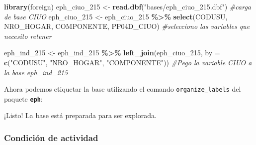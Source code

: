 \documentclass[
]{article}
\newenvironment{Shaded}{\begin{snugshade}}{\end{snugshade}}
\newcommand{\AttributeTok}[1]{\textcolor[rgb]{0.13,0.29,0.53}{#1}}
\newcommand{\CommentTok}[1]{\textcolor[rgb]{0.56,0.35,0.01}{\textit{#1}}}
\newcommand{\FunctionTok}[1]{\textcolor[rgb]{0.13,0.29,0.53}{\textbf{#1}}}
\newcommand{\NormalTok}[1]{#1}
\newcommand{\OtherTok}[1]{\textcolor[rgb]{0.56,0.35,0.01}{#1}}
\newcommand{\SpecialCharTok}[1]{\textcolor[rgb]{0.81,0.36,0.00}{\textbf{#1}}}
\newcommand{\StringTok}[1]{\textcolor[rgb]{0.31,0.60,0.02}{#1}}
\begin{document}
\begin{Shaded}
\begin{Highlighting}[]
\FunctionTok{library}\NormalTok{(foreign)}
\NormalTok{eph\_ciuo\_215 }\OtherTok{\textless{}{-}} \FunctionTok{read.dbf}\NormalTok{(}\StringTok{"bases/eph\_ciuo\_215.dbf"}\NormalTok{)  }\CommentTok{\#carga de base CIUO}
\NormalTok{eph\_ciuo\_215 }\OtherTok{\textless{}{-}}\NormalTok{ eph\_ciuo\_215 }\SpecialCharTok{\%\textgreater{}\%}
    \FunctionTok{select}\NormalTok{(CODUSU, NRO\_HOGAR, COMPONENTE, PP04D\_CIUO)  }\CommentTok{\#selecciono las variables que necesito retener}

\NormalTok{eph\_ind\_215 }\OtherTok{\textless{}{-}}\NormalTok{ eph\_ind\_215 }\SpecialCharTok{\%\textgreater{}\%}
    \FunctionTok{left\_join}\NormalTok{(eph\_ciuo\_215, }\AttributeTok{by =} \FunctionTok{c}\NormalTok{(}\StringTok{"CODUSU"}\NormalTok{, }\StringTok{"NRO\_HOGAR"}\NormalTok{, }\StringTok{"COMPONENTE"}\NormalTok{))  }\CommentTok{\#Pego la variable CIUO a la base eph\_ind\_215}
\end{Highlighting}
\end{Shaded}

Ahora podemos etiquetar la base utilizando el comando \texttt{organize\_labels} del paquete \textbf{\texttt{eph}}:

\begin{Shaded}
\end{Shaded}

¡Listo! La base está preparada para ser explorada.

\hypertarget{condiciuxf3n-de-actividad-1}{%
\subsubsection{Condición de actividad}\label{condiciuxf3n-de-actividad-1}}
\end{document}
